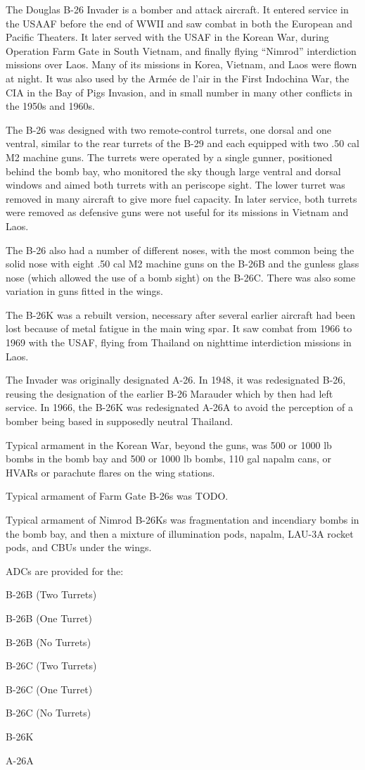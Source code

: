 
The Douglas B-26 Invader is a bomber and attack aircraft. It entered service in the USAAF before the end of WWII and saw combat in both the European and  Pacific Theaters. It later served with the USAF in the Korean War, during Operation Farm Gate in South Vietnam, and finally flying “Nimrod” interdiction missions over Laos. Many of its missions in Korea, Vietnam, and Laos were flown at night. It was also used by the Armée de l'air in the First Indochina War, the CIA in the Bay of Pigs Invasion, and in small number in many other conflicts in the 1950s and 1960s.

The B-26 was designed with two remote-control turrets, one dorsal and one ventral, similar to the rear turrets of the B-29 and each equipped with two .50 cal M2 machine guns. The turrets were operated by a single gunner, positioned behind the bomb bay, who monitored the sky though large ventral and dorsal windows and aimed both turrets with an periscope sight. The lower turret was removed in many aircraft to give more fuel capacity. In later service, both turrets were removed as defensive guns were not useful for its missions in Vietnam and Laos. 

The B-26 also had a number of different noses, with the most common being the solid nose with eight .50 cal M2 machine guns on the B-26B and the gunless glass nose (which allowed the use of a bomb sight) on the B-26C. There was also some variation in guns fitted in the wings.

The B-26K was a rebuilt version, necessary after several earlier aircraft had been lost because of metal fatigue in the main wing spar. It saw combat from 1966 to 1969 with the USAF, flying from Thailand on nighttime interdiction missions in Laos. 

The Invader was originally designated A-26. In 1948, it was redesignated B-26, reusing the designation of the earlier B-26 Marauder which by then had left service. In 1966, the B-26K was redesignated A-26A to avoid the perception of a bomber being based in supposedly neutral Thailand.

Typical armament in the Korean War, beyond the guns, was 500 or 1000 lb bombs in the bomb bay and 500 or 1000 lb bombs, 110 gal napalm cans, or HVARs or parachute flares on the wing stations.

Typical armament of Farm Gate B-26s was TODO.

Typical armament of Nimrod B-26Ks was fragmentation and incendiary bombs in the bomb bay, and then a mixture of illumination pods, napalm, LAU-3A rocket pods, and CBUs under the wings.

ADCs are provided for the:
\begin{adclist}
\item B-26B (Two Turrets)
\item B-26B (One Turret)
\item B-26B (No Turrets)
\item B-26C (Two Turrets)
\item B-26C (One Turret)
\item B-26C (No Turrets)
\item B-26K
\item A-26A
\end{adclist}

